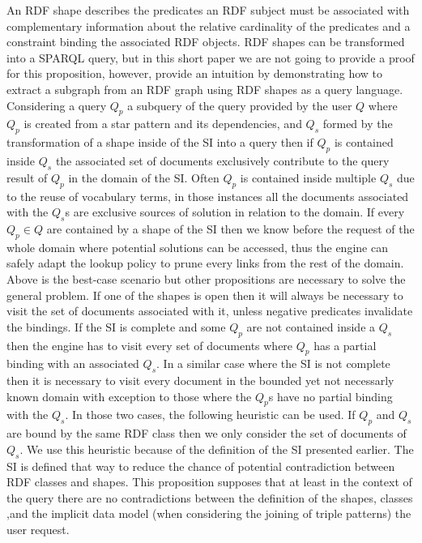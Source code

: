 An RDF shape describes the predicates an RDF subject must be associated with complementary information about
the relative cardinality of the predicates and a constraint binding the associated RDF objects.
RDF shapes can be transformed into a SPARQL query, but
in this short paper we are not going to provide a proof for this proposition, however,
\citeauthor{Delva2021} provide an intuition by demonstrating how to extract 
a subgraph from an RDF graph using RDF shapes as a query language.
Considering a query $Q_p$ a subquery of the query provided by the user $Q$
where $Q_p$ is created from a star pattern and its dependencies, and $Q_s$ formed by the transformation of a shape inside of the SI
into a query then if  $Q_p$ is contained inside $Q_s$ the associated 
set of documents exclusively contribute to the query result of $Q_p$ in the domain of the SI.
Often $Q_p$ is contained inside multiple $Q_s$ due to the reuse of vocabulary terms,
in those instances all the documents associated with the $Q_s$s are exclusive sources of solution in relation to the domain.
If every $Q_p \in Q$ are contained by a shape of the SI then we know before the request of the whole domain
where potential solutions can be accessed, thus the engine can safely adapt the lookup policy to prune every links from the rest of the domain.
Above is the best-case scenario but other propositions are necessary to solve the general problem.
If one of the shapes is open then it will always be necessary to visit the set of documents associated
with it, unless negative predicates invalidate the bindings.
If the SI is complete and some $Q_p$ are not contained inside a $Q_s$ then the engine has to visit
every set of documents where $Q_p$ has a partial binding with an associated $Q_s$.
In a similar case where the SI is not complete then it is necessary to visit every document in the bounded yet not necessarly known domain 
with exception to those where the $Q_p$s have no partial binding with the $Q_s$.
In those two cases, the following heuristic can be used.
If $Q_p$ and $Q_s$ are bound by the same RDF class then we only consider the set of documents of $Q_s$.
We use this heuristic because of the definition of the SI presented earlier.
The SI is defined that way to reduce the chance of potential contradiction between RDF classes and shapes.
This proposition supposes that at least in the context of the query there are no contradictions between the
definition of the shapes, classes ,and the implicit data model (when considering the joining of triple patterns) the user request.